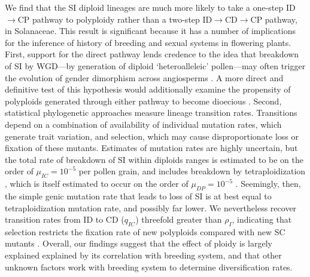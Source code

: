 We find that the SI diploid lineages are much more likely to take a
one-step  ID$\rightarrow$CP pathway to polyploidy rather than a two-step ID$\rightarrow$CD$\rightarrow$CP pathway, in Solanaceae.
This result is significant because it has a number of implications for the inference of history of breeding and sexual systems in flowering plants.
First, support for the direct pathway lends credence to the idea that breakdown of SI by WGD---by generation of diploid `heteroalleleic' pollen---may often trigger the evolution of gender dimorphism across angiosperms \citep{miller_2000}.
A more direct and definitive test of this hypothesis would additionally examine the propensity of polyploids generated through either pathway to become dioecious \citep{robertson_2011}.
Second, statistical phylogenetic approaches measure lineage transition rates.
Transitions depend on a combination of availability of individual mutation rates, which generate trait variation, and selection, which may cause disproportionate loss or fixation of these mutants.
Estimates of mutation rates are highly uncertain, but the total rate of breakdown of SI within diploids ranges is estimated to be on the order of  $\mu_{IC} = 10^{-5}$ per pollen grain, and includes breakdown by tetraploidization \citep{lewis1979}, which is itself estimated to occur on the order of $\mu_{DP} = 10^{-5}$ \citep{ramsey_1998}. 
Seemingly, then, the simple genic mutation rate that leads to loss of SI is at best equal to tetraploidization mutation rate, and possibly far lower.
We nevertheless recover transition rates from ID to CD ($q_{IC}$) threefold greater than $\rho_{I}$, indicating that selection restricts the fixation rate of new polyploids compared with new SC mutants \citep{robertson_2011}.
Overall, our findings suggest that the effect of ploidy is largely explained explained by its correlation with breeding system, and that other unknown factors work with breeding system to determine diversification rates.

